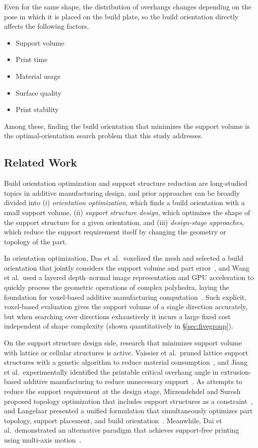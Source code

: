 \documentclass[11pt,a4paper]{article}
\begin{document}
Even for the same shape, the distribution of overhangs changes depending on the pose in which it is placed on the build plate,
so the build orientation directly affects the following factors.

\begin{itemize}
\item Support volume
\item Print time
\item Material usage
\item Surface quality
\item Print stability
\end{itemize}

Among these, finding the build orientation that minimizes the support volume is the optimal-orientation search problem that this study addresses.

\subsection{Related Work}
\label{sec:related}

Build orientation optimization and support structure reduction are long-studied topics in additive manufacturing design,
and prior approaches can be broadly divided into (i) \emph{orientation optimization}, which finds a build orientation with a small support volume,
(ii) \emph{support structure design}, which optimizes the shape of the support structure for a given orientation,
and (iii) \emph{design-stage approaches}, which reduce the support requirement itself by changing the geometry or topology of the part.

In orientation optimization, Das et al.\ voxelized the mesh and selected a build orientation that jointly considers the support volume and part error~\cite{das2017},
and Wang et al.\ used a layered depth--normal image representation and GPU acceleration to quickly process the geometric operations of complex polyhedra,
laying the foundation for voxel-based additive manufacturing computation~\cite{wang2010}.
Such explicit, voxel-based evaluation gives the support volume of a single direction accurately,
but when searching over directions exhaustively it incurs a large fixed cost independent of shape complexity
(shown quantitatively in \S\ref{sec:fivegroup}).

On the support structure design side, research that minimizes support volume with lattice or cellular structures is active.
Vaissier et al.\ pruned lattice support structures with a genetic algorithm to reduce material consumption~\cite{vaissier2019},
and Jiang et al.\ experimentally identified the printable critical overhang angle in extrusion-based additive manufacturing
to reduce unnecessary support~\cite{jiang2018}.
As attempts to reduce the support requirement at the design stage, Mirzendehdel and Suresh proposed topology optimization
that includes support structures as a constraint~\cite{mirzendehdel2016}, and Langelaar presented a unified formulation that simultaneously optimizes
part topology, support placement, and build orientation~\cite{langelaar2018}.
Meanwhile, Dai et al.\ demonstrated an alternative paradigm that achieves support-free printing using multi-axis motion~\cite{dai2018}.
\end{document}

